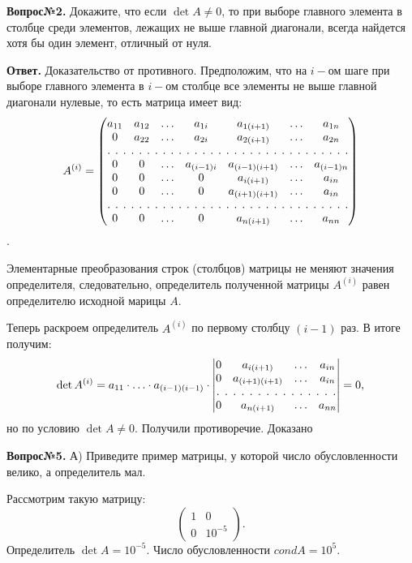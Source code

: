\documentclass{article}
\begin{document}
 \textbf{Вопрос№2.}  Докажите, что если $\det A \ne 0$, то при выборе главного элемента в столбце среди элементов, лежащих не выше главной диагонали, всегда найдется хотя бы один элемент, отличный от нуля. 
 
 \textbf{Ответ.} Доказательство от противного. 
 Предположим, что  на $i-$ом шаге при выборе главного элемента в $i-$ом столбце все элементы не выше главной диагонали нулевые, то есть матрица имеет вид:
 \[ A^{(i)} = 
 \begin{pmatrix}
 	a_{11} & a_{12} & \ldots  & a_{1i} & a_{1(i+1)} & \ldots & a_{1n}\\
 	0 & a_{22} & \ldots & a_{2i} & a_{2(i+1)} & \ldots & a_{2n}\\
 	\hdotsfor[2.5]{7}\\
 	0 & 0 & \ldots & a_{(i-1)i} & a_{(i-1)(i+1)} & \ldots & a_{(i-1)n}\\
 	0 & 0 & \ldots &  0 & a_{i(i+1)} & \ldots & a_{in}\\
 	0 & 0 & \ldots &  0 & a_{(i+1)(i+1)} & \ldots & a_{in}\\
 	\hdotsfor[2.5]{7}\\
 	0 & 0 & \ldots & 0  & a_{n(i+1)} & \ldots & a_{nn}\\
 \end{pmatrix}
 \].
 
 Элементарные преобразования строк (столбцов) матрицы не меняют значения определителя, следовательно, определитель полученной матрицы $A^{(i)}$ равен определителю исходной марицы $A$.
 
  Теперь раскроем определитель $A^{(i)}$ по первому столбцу $(i-1)$ раз. В итоге получим:
 $$\det A^{(i)} = a_{11}  \cdot \ldots \cdot a_{(i-1)(i-1)} \cdot 
 \begin{vmatrix}
 	0 & a_{i(i+1)} & \ldots & a_{in}\\
 	0 & a_{(i+1)(i+1)} & \ldots & a_{in}\\
 	\hdotsfor[2.5]{4}\\
 	0 & a_{n(i+1)} & \ldots & a_{nn}\\
 \end{vmatrix} = 0,
 $$
 но по условию $\det A \ne 0$. Получили противоречие.
 Доказано
 
 \medskip
 
 \textbf{Вопрос№5.} А) Приведите пример матрицы, у которой число обусловленности велико, а определитель мал. 
 
 Рассмотрим такую матрицу:
 \[ 
 \begin{pmatrix}
 	1 & 0\\
 	0 & 10^{-5}
 \end{pmatrix}.
\]
Определитель $\det A = 10^{-5} $. Число обусловленности $cond A = 10^5$.
\end{document}
